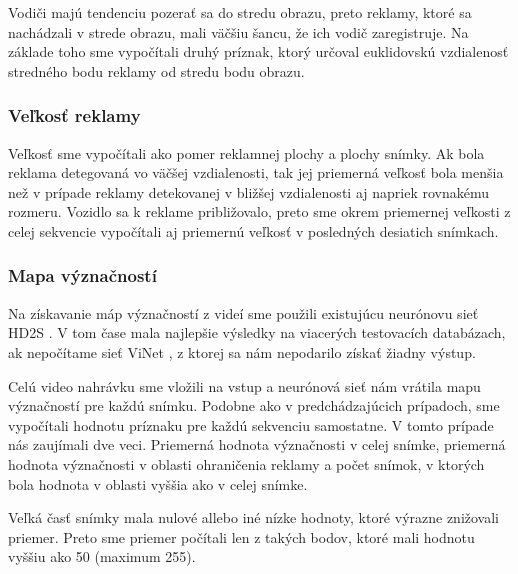 Vodiči majú tendenciu pozerať sa do stredu obrazu, preto reklamy, ktoré sa nachádzali v strede obrazu, mali väčšiu šancu, že ich vodič zaregistruje. Na základe toho sme vypočítali druhý príznak, ktorý určoval euklidovskú vzdialenosť stredného bodu reklamy od stredu bodu obrazu.

\subsubsection{Veľkosť reklamy}

Veľkosť sme vypočítali ako pomer reklamnej plochy a plochy snímky. Ak bola reklama detegovaná vo väčšej vzdialenosti, tak jej priemerná veľkosť bola menšia než v prípade reklamy detekovanej v bližšej vzdialenosti aj napriek rovnakému rozmeru. Vozidlo sa k reklame približovalo, preto sme okrem priemernej veľkosti z celej sekvencie vypočítali aj priemernú veľkosť v posledných desiatich snímkach.

\subsubsection{Mapa význačností}

Na získavanie máp význačností z videí sme použili existujúcu neurónovu sieť HD2S \cite{hd2s}. V tom čase mala najlepšie výsledky na viacerých testovacích databázach, ak nepočítame sieť ViNet \cite{jain2021vinet}, z ktorej sa nám nepodarilo získať žiadny výstup.

Celú video nahrávku sme vložili na vstup a neurónová sieť nám vrátila mapu význačností pre každú snímku. Podobne ako v predchádzajúcich prípadoch, sme vypočítali hodnotu príznaku pre každú sekvenciu samostatne. V tomto prípade nás zaujímali dve veci. Priemerná hodnota význačnosti v celej snímke, priemerná hodnota význačnosti v oblasti ohraničenia reklamy a počet snímok, v ktorých bola hodnota v oblasti vyššia ako v celej snímke.

Veľká časť snímky mala nulové allebo iné nízke hodnoty, ktoré výrazne znižovali priemer. Preto sme priemer počítali len z takých bodov, ktoré mali hodnotu vyššiu ako 50 (maximum 255).